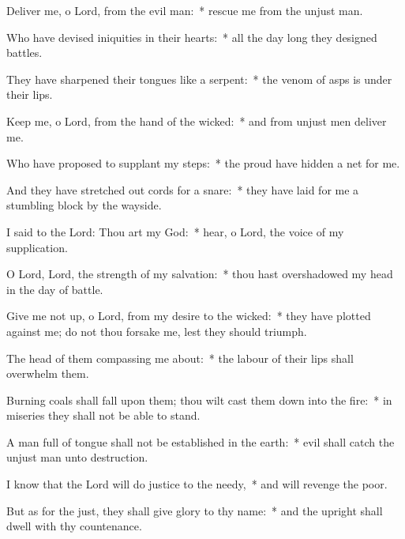 \begin{enpars}
\item Deliver me, o Lord, from the evil man:~* rescue me from the unjust man.
\item Who have devised iniquities in their hearts:~* all the day long they designed battles.
\item They have sharpened their tongues like a serpent:~* the venom of asps is under their lips.
\item Keep me, o Lord, from the hand of the wicked:~* and from unjust men deliver me.
\item Who have proposed to supplant my steps:~* the proud have hidden a net for me.
\item And they have stretched out cords for a snare:~* they have laid for me a stumbling block by the wayside.
\item I said to the Lord: Thou art my God:~* hear, o Lord, the voice of my supplication.
\item O Lord, Lord, the strength of my salvation:~* thou hast overshadowed my head in the day of battle.
\item Give me not up, o Lord, from my desire to the wicked:~* they have plotted against me; do not thou forsake me, lest they should triumph.
\item The head of them compassing me about:~* the labour of their lips shall overwhelm them.
\item Burning coals shall fall upon them; thou wilt cast them down into the fire:~* in miseries they shall not be able to stand.
\item A man full of tongue shall not be established in the earth:~* evil shall catch the unjust man unto destruction.
\item I know that the Lord will do justice to the needy,~* and will revenge the poor.
\item But as for the just, they shall give glory to thy name:~* and the upright shall dwell with thy countenance.
\end{enpars}